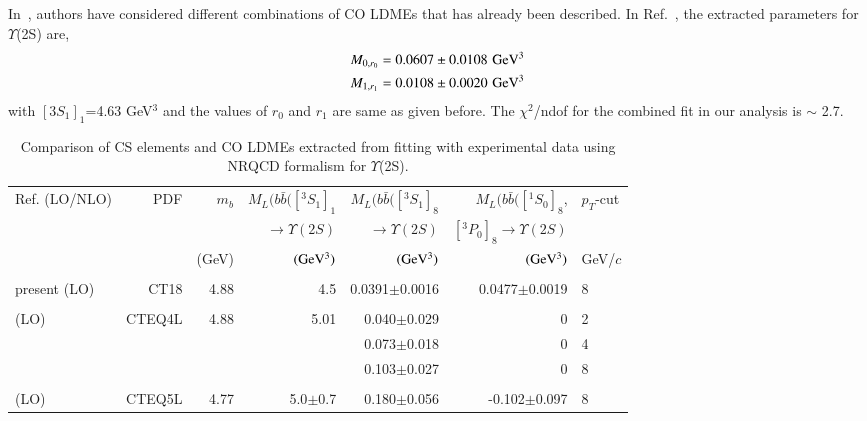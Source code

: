 \documentclass[review]{elsarticle}
\begin{document}
In~\cite{Domenech:2000ri,Brateen:PRD2001,Sharma:2012dy,Gong:2013qka,Feng:2015wka,Han:2014kxa}, 
authors have considered different combinations of
CO LDMEs that has already been described. In Ref.~\cite{Han:2014kxa}, the extracted 
parameters for $\Upsilon$(2S) are,
\begin{eqnarray}
  \nonumber
  M_{0,r_0}=0.0607\pm0.0108 \,\,{\rm GeV^3}\\ \nonumber
  M_{1,r_1}=0.0108\pm0.0020 \,\,{\rm GeV^3}
\end{eqnarray}
with $[3S_1]_1$=4.63 GeV$^3$ and the values of $r_0$ and $r_1$ are same as given before.
The $\chi^2$/ndof for the 
combined fit in our analysis is $\sim$ 2.7.

\begin{table}
  \centering
  \caption{Comparison of CS elements and CO LDMEs extracted from fitting with experimental data
    using NRQCD formalism for $\Upsilon$(2S).}
  \footnotesize
  \begin{tabular*}{\textwidth}{@{\extracolsep{\fill}}lrrrrrl@{}}
    \hline
    \hline
    Ref. (LO/NLO) & PDF & $m_b$ & $M_L(b\bar{b}([^3S_1]_1$ & $M_L(b\bar{b}([^3S_1]_8$ & 
    $M_L(b\bar{b}([^1S_0]_8$, & $p_T$-cut \\
    & & & $\rightarrow\Upsilon(2S)$ & $\rightarrow\Upsilon(2S)$ & $[^3P_0]_8\rightarrow\Upsilon(2S)$ & \\
    & & (GeV) & $({\rm GeV^3})$ & $({\rm GeV^3})$ & $({\rm GeV^3})$ & GeV/$c$ \\
    \hline
    \hline
    & & & & & & \\
    present (LO) & CT18 &4.88 &4.5 &0.0391$\pm$0.0016 & 0.0477$\pm$0.0019 & 8   \\
    & & & & & & \\
    \cite{Domenech:2000ri} (LO) & CTEQ4L & 4.88 & 5.01 & 0.040$\pm$0.029 & 0 & 2 \\
    & & & & 0.073$\pm$0.018 & 0 & 4 \\
    & & & & 0.103$\pm$0.027 & 0 & 8 \\
    & & & & & & \\
    \cite{Brateen:PRD2001} (LO) & CTEQ5L & 4.77 & 5.0$\pm$0.7 & 0.180$\pm$0.056 & -0.102$\pm$0.097 & 8 \\

\end{tabular*}
\end{table}
\end{document}

